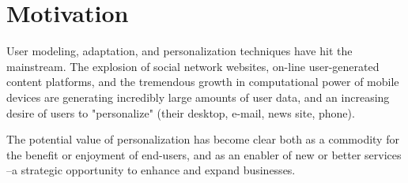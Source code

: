 %
%
% 
% 
% 
% 
% 
% 
% 
\section{Motivation}

 User modeling, adaptation, and personalization techniques have hit the mainstream. The explosion of social network websites, on-line user-generated content platforms, and the tremendous growth in computational power of mobile devices are generating incredibly large amounts of user data, and an increasing desire of users to "personalize" (their desktop, e-mail, news site, phone).

 The potential value of personalization has become clear both as a commodity for the benefit or enjoyment of end-users, and as an enabler of new or better services –a strategic opportunity to enhance and expand businesses.

